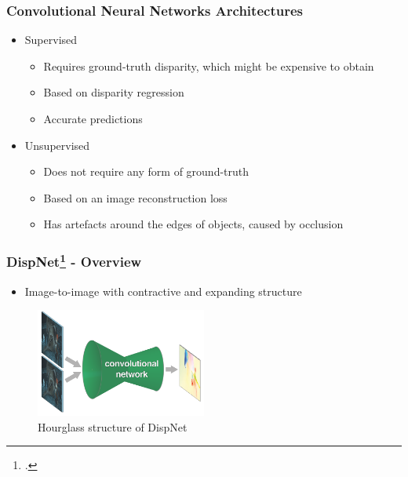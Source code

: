 \documentclass{beamer}
\begin{document}
\begin{frame}
\frametitle{Convolutional Neural Networks Architectures}
\center
\begin{itemize}
	\item Supervised
		\begin{itemize}
			\item Requires ground-truth disparity, which might be expensive to obtain
			\item Based on disparity regression
			\item Accurate predictions
		\end{itemize}
	\item Unsupervised
		\begin{itemize}
			\item Does not require any form of ground-truth
			\item Based on an image reconstruction loss
			\item Has artefacts around the edges of objects, caused by occlusion
		\end{itemize}
\end{itemize}
\end{frame}

\begin{frame}
\frametitle{DispNet\footcite{DBLP:journals/corr/MayerIHFCDB15} - Overview}
\center
\begin{itemize}
	\item Image-to-image with contractive and expanding structure
\end{itemize}
\begin{figure}
    \centering
        \includegraphics[width=0.5\textwidth]{hourglass.png}
        \caption{Hourglass structure of DispNet}
    \end{figure}
\end{frame}
\end{document}

